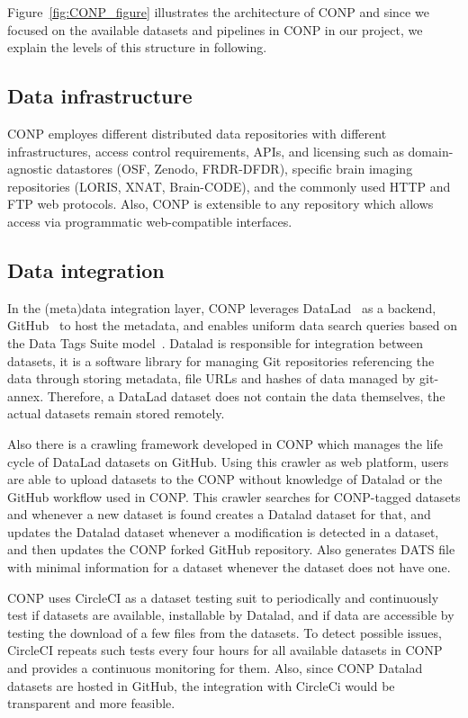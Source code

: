 Figure~\ref{fig:CONP_figure} illustrates the architecture of CONP and since we focused on the available datasets and pipelines in CONP in our project, we explain the levels of this structure in following. 

\subsection{Data infrastructure}
CONP employes different distributed data repositories with different infrastructures, access control requirements, APIs, and licensing such as domain-agnostic datastores (OSF, Zenodo, FRDR-DFDR), specific brain imaging repositories (LORIS, XNAT, Brain-CODE), and the commonly used HTTP and FTP web protocols. Also, CONP is extensible to any repository which allows access via programmatic web-compatible interfaces.

\subsection{Data integration}
In the (meta)data integration layer, CONP leverages DataLad~\cite{} as a backend, GitHub~\cite{} to host the metadata, and enables uniform data search queries based on the Data Tags Suite model~\cite{}. Datalad is responsible for integration between datasets, it is a software library for managing Git repositories referencing the data through storing metadata, file URLs and hashes of data managed by git-annex. Therefore, a DataLad dataset does not contain the data themselves, the actual datasets remain stored remotely.

Also there is a crawling framework developed in CONP which manages the life cycle of DataLad datasets on GitHub. Using this crawler as web platform, users are able to upload datasets to the CONP without knowledge of Datalad or the GitHub workflow used in CONP. This crawler searches for CONP-tagged datasets and whenever a new dataset is found creates a Datalad dataset for that, and updates the Datalad dataset whenever a modification is detected in a dataset, and then updates the CONP forked GitHub repository. Also generates DATS file with minimal information for a dataset whenever the dataset does not have one.

CONP uses CircleCI as a dataset testing suit to periodically and continuously test if datasets are available, installable by Datalad, and if data are accessible by testing the download of a few files from the datasets. To detect possible issues, CircleCI repeats such tests every four hours for all available datasets in CONP and provides a continuous monitoring for them. Also, since CONP Datalad datasets are hosted in GitHub, the integration with CircleCi would be transparent and more feasible.

